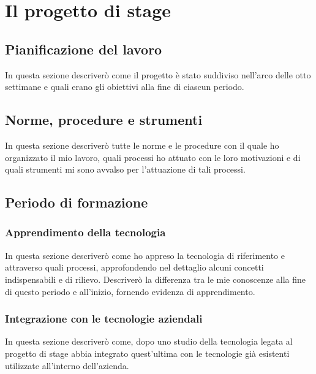 
\chapter{Il progetto di stage}
\label{cap:descrizione-stage}

\section{Pianificazione del lavoro}

In questa sezione descriverò come il progetto è stato suddiviso nell'arco delle otto settimane e quali erano gli obiettivi alla fine di ciascun periodo.

\section{Norme, procedure e strumenti}

In questa sezione descriverò tutte le norme e le procedure con il quale ho organizzato il mio lavoro, quali processi ho attuato con le loro motivazioni e di quali strumenti mi sono avvalso per l'attuazione di tali processi.

\section{Periodo di formazione}

\subsection{Apprendimento della tecnologia}

In questa sezione descriverò come ho appreso la tecnologia di riferimento e attraverso quali processi, approfondendo nel dettaglio alcuni concetti indispensabili e di rilievo. Descriverò la differenza tra le mie conoscenze alla fine di questo periodo e all'inizio, fornendo evidenza di apprendimento.

\subsection{Integrazione con le tecnologie aziendali}

In questa sezione descriverò come, dopo uno studio della tecnologia legata al progetto di stage abbia integrato quest'ultima con le tecnologie già esistenti utilizzate all'interno dell'azienda.

